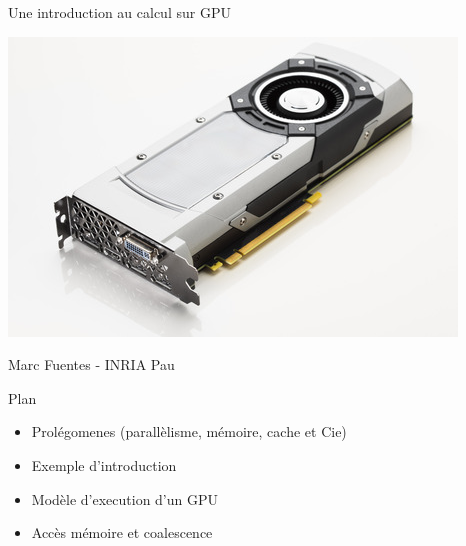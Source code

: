 \documentclass[11pt,mathserif]{beamer}
\begin{document}
\begin{frame}
\begin{center}
{\Large Une introduction au calcul sur GPU} 
\end{center}
\begin{center}
\includegraphics[width=0.5\linewidth]{fig/gpu.jpg}
\end{center}
\begin{center}
{\large Marc Fuentes - INRIA Pau\\ }
\end{center}
\end{frame}


\begin{frame}{Plan}
\begin{itemize}[<+->]
\item Prolégomenes (parallèlisme, mémoire, cache et Cie)
\item Exemple d'introduction
\item Modèle d'execution d'un GPU
\item Accès mémoire et coalescence
\end{itemize}
\end{frame}
\end{document}
